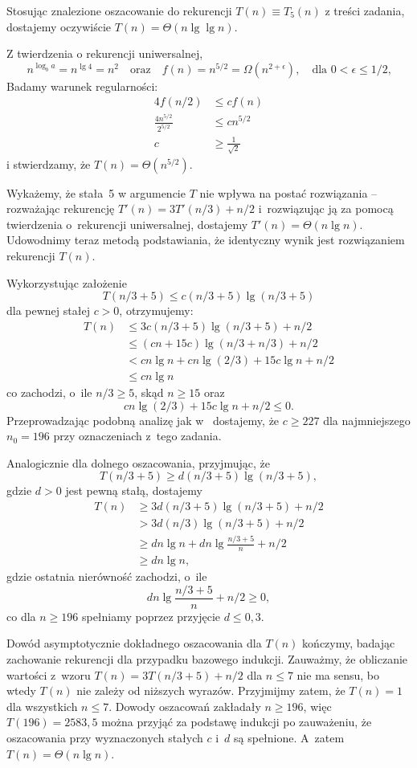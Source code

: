 Stosując znalezione oszacowanie do rekurencji $T(n)\equiv T_5(n)$ z treści zadania, dostajemy oczywiście $T(n)=\Theta(n\lg\lg n)$.

\subproblem %
Z twierdzenia o rekurencji uniwersalnej,
\[
	n^{\log_ba} = n^{\lg4} = n^2 \quad\text{oraz}\quad f(n) = n^{5/2} = \Omega(n^{2+\epsilon}), \quad\text{dla $0<\epsilon\le1/2$,}
\]
Badamy warunek regularności:
\begin{align*}
	4f(n/2) &\le cf(n) \\
	\frac{4n^{5/2}}{2^{5/2}} &\le cn^{5/2} \\
	c &\ge \frac{1}{\sqrt{2}}
\end{align*}
i stwierdzamy, że $T(n)=\Theta(n^{5/2})$.

\subproblem %
Wykażemy, że stała~5 w argumencie $T$ nie wpływa na postać rozwiązania -- rozważając rekurencję $T'(n)=3T'(n/3)+n/2$ i~rozwiązując ją za pomocą twierdzenia o~rekurencji uniwersalnej, dostajemy $T'(n)=\Theta(n\lg n)$. Udowodnimy teraz metodą podstawiania, że identyczny wynik jest rozwiązaniem rekurencji $T(n)$.

Wykorzystując założenie
\[
	T(n/3+5) \le c(n/3+5)\lg(n/3+5)
\]
dla pewnej stałej $c>0$, otrzymujemy:
\begin{align*}
	T(n) &\le 3c(n/3+5)\lg(n/3+5)+n/2 \\
	&\le (cn+15c)\lg(n/3+n/3)+n/2 \\
	&< cn\lg n+cn\lg(2/3)+15c\lg n+n/2 \\
	&\le cn\lg n
\end{align*}
co zachodzi, o~ile $n/3\ge5$, skąd $n\ge15$ oraz
\[
	cn\lg(2/3)+15c\lg n+n/2 \le 0.
\]
Przeprowadzając podobną analizę jak w~ dostajemy, że $c\ge227$ dla najmniejszego $n_0=196$ przy oznaczeniach z~tego zadania.

Analogicznie dla dolnego oszacowania, przyjmując, że
\[
	T(n/3+5) \ge d(n/3+5)\lg(n/3+5),
\]
gdzie $d>0$ jest pewną stałą, dostajemy
\begin{align*}
	T(n) &\ge 3d(n/3+5)\lg(n/3+5)+n/2 \\
	&> 3d(n/3)\lg(n/3+5)+n/2 \\
	&\ge dn\lg n+dn\lg\frac{n/3+5}{n}+n/2 \\
	&\ge dn\lg n,
\end{align*}
gdzie ostatnia nierówność zachodzi, o~ile
\[
	dn\lg\frac{n/3+5}{n}+n/2 \ge 0,
\]
co dla $n\ge196$ spełniamy poprzez przyjęcie $d\le0{,}3$.

Dowód asymptotycznie dokładnego oszacowania dla $T(n)$ kończymy, badając zachowanie rekurencji dla przypadku bazowego indukcji. Zauważmy, że obliczanie wartości z~wzoru $T(n)=3T(n/3+5)+n/2$ dla $n\le7$ nie ma sensu, bo wtedy $T(n)$ nie zależy od niższych wyrazów. Przyjmijmy zatem, że $T(n)=1$ dla wszystkich $n\le7$. Dowody oszacowań zakładały $n\ge196$, więc $T(196)=2583{,}5$ można przyjąć za podstawę indukcji po zauważeniu, że oszacowania przy wyznaczonych stałych $c$ i~$d$ są spełnione. A~zatem $T(n)=\Theta(n\lg n)$.


